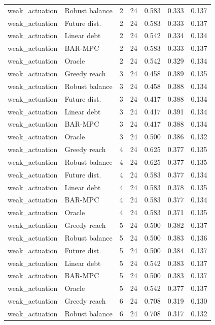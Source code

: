 \begin{longtable}{llrrrrr}
weak\_actuation & Robust balance & 2 & 24 & 0.583 & 0.333 & 0.137 \\
weak\_actuation & Future dist. & 2 & 24 & 0.583 & 0.333 & 0.137 \\
weak\_actuation & Linear debt & 2 & 24 & 0.542 & 0.334 & 0.134 \\
weak\_actuation & BAR-MPC & 2 & 24 & 0.583 & 0.333 & 0.137 \\
weak\_actuation & Oracle & 2 & 24 & 0.542 & 0.329 & 0.134 \\
weak\_actuation & Greedy reach & 3 & 24 & 0.458 & 0.389 & 0.135 \\
weak\_actuation & Robust balance & 3 & 24 & 0.458 & 0.388 & 0.134 \\
weak\_actuation & Future dist. & 3 & 24 & 0.417 & 0.388 & 0.134 \\
weak\_actuation & Linear debt & 3 & 24 & 0.417 & 0.391 & 0.134 \\
weak\_actuation & BAR-MPC & 3 & 24 & 0.417 & 0.388 & 0.134 \\
weak\_actuation & Oracle & 3 & 24 & 0.500 & 0.386 & 0.132 \\
weak\_actuation & Greedy reach & 4 & 24 & 0.625 & 0.377 & 0.135 \\
weak\_actuation & Robust balance & 4 & 24 & 0.625 & 0.377 & 0.135 \\
weak\_actuation & Future dist. & 4 & 24 & 0.583 & 0.377 & 0.134 \\
weak\_actuation & Linear debt & 4 & 24 & 0.583 & 0.378 & 0.135 \\
weak\_actuation & BAR-MPC & 4 & 24 & 0.583 & 0.377 & 0.134 \\
weak\_actuation & Oracle & 4 & 24 & 0.583 & 0.371 & 0.135 \\
weak\_actuation & Greedy reach & 5 & 24 & 0.500 & 0.382 & 0.137 \\
weak\_actuation & Robust balance & 5 & 24 & 0.500 & 0.383 & 0.136 \\
weak\_actuation & Future dist. & 5 & 24 & 0.500 & 0.384 & 0.137 \\
weak\_actuation & Linear debt & 5 & 24 & 0.542 & 0.383 & 0.137 \\
weak\_actuation & BAR-MPC & 5 & 24 & 0.500 & 0.383 & 0.137 \\
weak\_actuation & Oracle & 5 & 24 & 0.542 & 0.377 & 0.137 \\
weak\_actuation & Greedy reach & 6 & 24 & 0.708 & 0.319 & 0.130 \\
weak\_actuation & Robust balance & 6 & 24 & 0.708 & 0.317 & 0.132 \\

\end{longtable}
